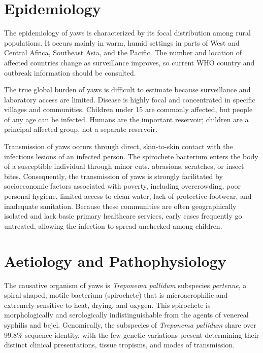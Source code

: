 \section*{Epidemiology}
The epidemiology of yaws is characterized by its focal distribution among rural populations. It occurs mainly in warm, humid settings in parts of West and Central Africa, Southeast Asia, and the Pacific. The number and location of affected countries change as surveillance improves, so current WHO country and outbreak information should be consulted.

The true global burden of yaws is difficult to estimate because surveillance and laboratory access are limited. Disease is highly focal and concentrated in specific villages and communities. Children under 15 are commonly affected, but people of any age can be infected. Humans are the important reservoir; children are a principal affected group, not a separate reservoir.

Transmission of yaws occurs through direct, skin-to-skin contact with the infectious lesions of an infected person. The spirochete bacterium enters the body of a susceptible individual through minor cuts, abrasions, scratches, or insect bites. Consequently, the transmission of yaws is strongly facilitated by socioeconomic factors associated with poverty, including overcrowding, poor personal hygiene, limited access to clean water, lack of protective footwear, and inadequate sanitation. Because these communities are often geographically isolated and lack basic primary healthcare services, early cases frequently go untreated, allowing the infection to spread unchecked among children.

\section*{Aetiology and Pathophysiology}
The causative organism of yaws is \textit{Treponema pallidum} subspecies \textit{pertenue}, a spiral-shaped, motile bacterium (spirochete) that is microaerophilic and extremely sensitive to heat, drying, and oxygen. This spirochete is morphologically and serologically indistinguishable from the agents of venereal syphilis and bejel. Genomically, the subspecies of \textit{Treponema pallidum} share over 99.8\% sequence identity, with the few genetic variations present determining their distinct clinical presentations, tissue tropisms, and modes of transmission.

